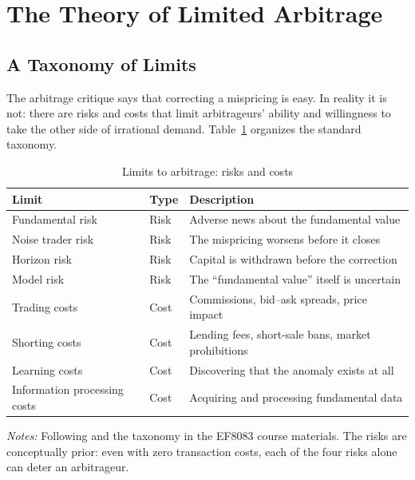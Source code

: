 \section{The Theory of Limited Arbitrage}
\label{sec:arbtheory}

\subsection{A Taxonomy of Limits}

The arbitrage critique says that correcting a mispricing is easy. In reality it is not: there are risks and costs that limit arbitrageurs' ability and willingness to take the other side of irrational demand. Table~\ref{tab:limits} organizes the standard taxonomy.

\begin{table}[htbp]
\centering
\begin{threeparttable}
\caption{Limits to arbitrage: risks and costs}
\label{tab:limits}
\begin{tabular}{lll}
\toprule
Limit & Type & Description \\
\midrule
Fundamental risk & Risk & Adverse news about the fundamental value \\
Noise trader risk & Risk & The mispricing worsens before it closes \\
Horizon risk & Risk & Capital is withdrawn before the correction \\
Model risk & Risk & The ``fundamental value'' itself is uncertain \\
Trading costs & Cost & Commissions, bid--ask spreads, price impact \\
Shorting costs & Cost & Lending fees, short-sale bans, market prohibitions \\
Learning costs & Cost & Discovering that the anomaly exists at all \\
Information processing costs & Cost & Acquiring and processing fundamental data \\
\bottomrule
\end{tabular}
\begin{tablenotes}[flushleft]\small
\item \textit{Notes:} Following \citet{shleifer1997} and the taxonomy in the EF8083 course materials. The risks are conceptually prior: even with zero transaction costs, each of the four risks alone can deter an arbitrageur.
\end{tablenotes}
\end{threeparttable}
\end{table}

